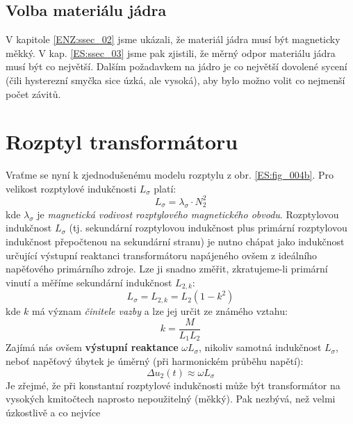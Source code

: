     \subsection{Volba materiálu jádra}\label{ES:ssec_04}
      V kapitole \ref{ENZ:ssec_02} jsme ukázali, že materiál jádra musí být magneticky měkký. V kap. 
      \ref{ES:ssec_03} jsme pak zjistili, že měrný odpor materiálu jádra musí být co největší.
      Dalším požadavkem na jádro je co největší dovolené sycení (čili hysterezní smyčka sice úzká, 
      ale vysoká), aby bylo možno volit co nejmenší počet závitů.
    
  \section{Rozptyl transformátoru}
    Vraťme se nyní k zjednodušenému modelu rozptylu z obr. \ref{ES:fig_004b}. Pro velikost
    roz\-ptyl\-ové indukčnosti $L_\sigma$ platí:
    \begin{equation}\label{es:eq_Lsigma}
      L_\sigma=\lambda_\sigma\cdot N_2^2
    \end{equation}
    kde $\lambda_\sigma$ je \emph{magnetická vodivost rozptylového magnetického obvodu}. 
    Rozptylovou indukčnost $L_\sigma$ (tj. sekundární rozptylovou indukčnost plus primární 
    rozptylovou indukčnost přepočtenou na sekundární stranu) je nutno chápat jako indukčnost 
    určující výstupní reaktanci transformátoru napájeného ovšem z ideálního napěťového primárního 
    zdroje. Lze ji snadno změřit, zkratujeme-li primární vinutí a měříme sekundární indukčnost
    $L_{2,k}$:
    \begin{equation}\label{es:eq_L2k}
      L_\sigma=L_{2,k}= L_2(1-k^2)
    \end{equation}
    kde $k$ má význam \emph{činitele vazby} a lze jej určit ze známého vztahu:
    \begin{equation}\label{es:eq_cinitel_vazby}
      k=\frac{M}{L_1L_2}
    \end{equation}
    Zajímá nás ovšem \textbf{výstupní reaktance} $\omega L_\sigma$, nikoliv samotná indukčnost 
    $L_\sigma$, neboť napěťový úbytek je úměrný (při harmonickém průběhu napětí):
    \begin{equation}\label{es:eq_nap_ubytek}
      \Delta u_2(t)\approx \omega L_\sigma
    \end{equation}
    Je zřejmé, že při konstantní rozptylové indukčnosti může být transformátor na vysokých 
    kmitočtech naprosto nepoužitelný (měkký). Pak nezbývá, než velmi ú\-zkost\-li\-vě a co nejvíce 
